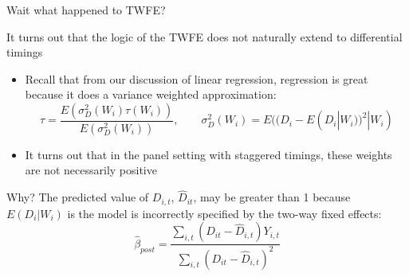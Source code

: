\documentclass[notes,11pt, aspectratio=169]{beamer}
\newenvironment{wideitemize}{\itemize\addtolength{\itemsep}{10pt}}{\enditemize}
\begin{document}
\begin{frame}{Wait what happened to TWFE?}
	\begin{wideitemize}
		\item It turns out that the logic of the TWFE does not naturally extend to differential timings
		\begin{itemize}
			\item Recall that from our discussion of linear regression, regression is great because it does a variance weighted approximation:
			      \begin{equation*}
				      \tau = \frac{E(\sigma^{2}_{D}(W_{i})\tau(W_{i}))}{E(\sigma^{2}_{D}(W_{i}))}, \qquad \sigma^{2}_{D}(W_{i}) = E((D_{i} - E(D_{i}|W_{i}))^{2} | W_{i})
			      \end{equation*}
			\item It turns out that in the panel setting with staggered timings,
			      these weights are not necessarily positive
		\end{itemize}
		\item Why? The predicted value of $D_{i,t}$, $\hat{D}_{it}$, may be
		greater than 1 because $E(D_{i}|W_{i})$ is the model is incorrectly specified by
		the two-way fixed effects:
		\begin{equation*}
			\hat{\beta}_{post} = \frac{\sum_{i,t}(D_{it}- \hat{D}_{i,t})Y_{i,t}}{\sum_{i,t}(D_{it}- \hat{D}_{i,t})^{2}}
		\end{equation*}
	\end{wideitemize}
\end{frame}
\end{document}
